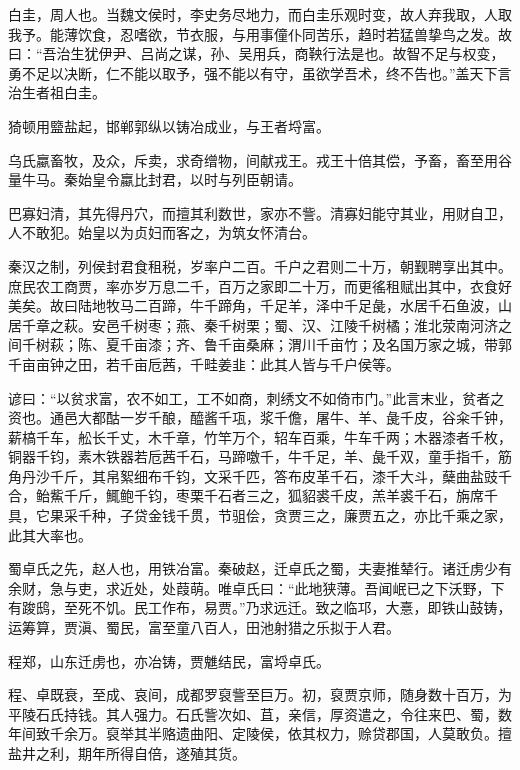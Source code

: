 \documentclass[12pt,UTF8]{ctexbook}
\begin{document}
白圭，周人也。当魏文侯时，李史务尽地力，而白圭乐观时变，故人弃我取，人取我予。能薄饮食，忍嗜欲，节衣服，与用事僮仆同苦乐，趋时若猛兽挚鸟之发。故曰：“吾治生犹伊尹、吕尚之谋，孙、吴用兵，商鞅行法是也。故智不足与权变，勇不足以决断，仁不能以取予，强不能以有守，虽欲学吾术，终不告也。”盖天下言治生者祖白圭。



猗顿用盬盐起，邯郸郭纵以铸冶成业，与王者埒富。



乌氏蠃畜牧，及众，斥卖，求奇缯物，间献戎王。戎王十倍其偿，予畜，畜至用谷量牛马。秦始皇令蠃比封君，以时与列臣朝请。



巴寡妇清，其先得丹穴，而擅其利数世，家亦不訾。清寡妇能守其业，用财自卫，人不敢犯。始皇以为贞妇而客之，为筑女怀清台。



秦汉之制，列侯封君食租税，岁率户二百。千户之君则二十万，朝觐聘享出其中。庶民农工商贾，率亦岁万息二千，百万之家即二十万，而更徭租赋出其中，衣食好美矣。故曰陆地牧马二百蹄，牛千蹄角，千足羊，泽中千足彘，水居千石鱼波，山居千章之萩。安邑千树枣；燕、秦千树栗；蜀、汉、江陵千树橘；淮北荥南河济之间千树萩；陈、夏千亩漆；齐、鲁千亩桑麻；渭川千亩竹；及名国万家之城，带郭千亩亩钟之田，若千亩卮茜，千畦姜韭：此其人皆与千户侯等。



谚曰：“以贫求富，农不如工，工不如商，刺绣文不如倚市门。”此言末业，贫者之资也。通邑大都酤一岁千酿，醯酱千瓨，浆千儋，屠牛、羊、彘千皮，谷籴千钟，薪槁千车，舩长千丈，木千章，竹竿万个，轺车百乘，牛车千两；木器漆者千枚，铜器千钧，素木铁器若卮茜千石，马蹄噭千，牛千足，羊、彘千双，童手指千，筋角丹沙千斤，其帛絮细布千钧，文采千匹，答布皮革千石，漆千大斗，蘖曲盐豉千合，鲐鮆千斤，鮿鲍千钧，枣栗千石者三之，狐貂裘千皮，羔羊裘千石，旃席千具，它果采千种，子贷金钱千贯，节驵侩，贪贾三之，廉贾五之，亦比千乘之家，此其大率也。



蜀卓氏之先，赵人也，用铁冶富。秦破赵，迁卓氏之蜀，夫妻推辇行。诸迁虏少有余财，急与吏，求近处，处葭萌。唯卓氏曰：“此地狭薄。吾闻岷已之下沃野，下有踆鸱，至死不饥。民工作布，易贾。”乃求远迁。致之临邛，大憙，即铁山鼓铸，运筹算，贾滇、蜀民，富至童八百人，田池射猎之乐拟于人君。



程郑，山东迁虏也，亦冶铸，贾魋结民，富埒卓氏。



程、卓既衰，至成、哀间，成都罗裒訾至巨万。初，裒贾京师，随身数十百万，为平陵石氏持钱。其人强力。石氏訾次如、苴，亲信，厚资遣之，令往来巴、蜀，数年间致千余万。裒举其半赂遗曲阳、定陵侯，依其权力，赊贷郡国，人莫敢负。擅盐井之利，期年所得自倍，遂殖其货。
\end{document}
